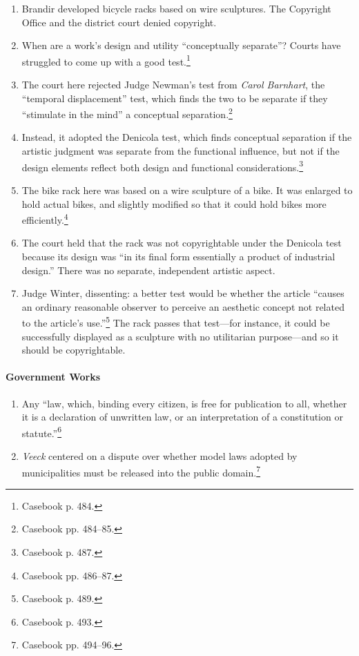 \begin{enumerate}
    \item Brandir developed bicycle racks based on wire sculptures. The 
    Copyright Office and the district court denied copyright.
    \item When are a work's design and utility ``conceptually separate''? 
    Courts have struggled to come up with a good test.\footnote{Casebook p. 
    484.}
    \item The court here rejected Judge Newman's test from \emph{Carol 
    Barnhart}, the ``temporal displacement'' test, which finds the two to be 
    separate if they ``stimulate in the mind'' a conceptual 
    separation.\footnote{Casebook pp. 484--85.}
    \item Instead, it adopted the Denicola test, which finds conceptual 
    separation if the artistic judgment was separate from the functional 
    influence, but not if the design elements reflect both design and 
    functional considerations.\footnote{Casebook p. 487.}
    \item The bike rack here was based on a wire sculpture of a bike. It was 
    enlarged to hold actual bikes, and slightly modified so that it could hold 
    bikes more efficiently.\footnote{Casebook pp. 486--87.}
    \item The court held that the rack was not copyrightable under the 
    Denicola test because its design was ``in its final form essentially a 
    product of industrial design.'' There was no separate, independent 
    artistic aspect.
    \item Judge Winter, dissenting: a better test would be whether the article 
    ``causes an ordinary reasonable observer to perceive an aesthetic concept 
    not related to the article's use.''\footnote{Casebook p. 489.} The rack 
    passes that test---for instance, it could be successfully displayed as a 
    sculpture with no utilitarian purpose---and so it should be copyrightable.
\end{enumerate}

\paragraph{Government Works}

\begin{enumerate}
    \item Any ``law, which, binding every citizen, is free for publication to 
    all, whether it is a declaration of unwritten law, or an interpretation of 
    a constitution or statute.''\footnote{Casebook p. 493.}
    \item \emph{Veeck} centered on a dispute over whether model laws adopted 
    by municipalities must be released into the public 
    domain.\footnote{Casebook pp. 494--96.}
\end{enumerate}

